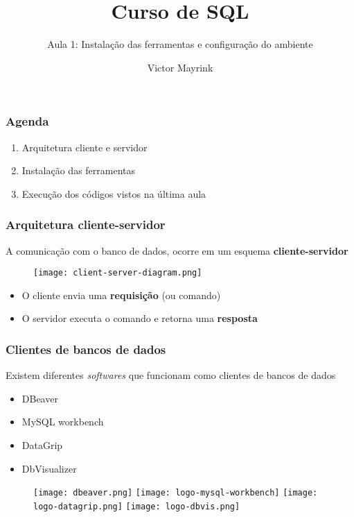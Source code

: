 \documentclass[t, 10pt, aspectratio=169, table, x11names]{beamer}
\begin{document}
	\author{Victor Mayrink}
	\title{Curso de SQL}
	\subtitle{Aula 1: Instalação das ferramentas e configuração do ambiente}

	\begin{frame}[plain]
		\maketitle
	\end{frame}
	
	\begin{frame}
		\frametitle{Agenda}
		\vspace{1cm}
		\begin{enumerate}
			\large
			\item Arquitetura cliente e servidor
			\item Instalação das ferramentas
			\item Execução dos códigos vistos na última aula
		\end{enumerate}
	\end{frame}

	\begin{frame}
		\frametitle{Arquitetura cliente-servidor}
		A comunicação com o banco de dados, ocorre em um esquema \textbf{cliente-servidor}
		\vspace{3mm}
		\begin{figure}[h]
			\texttt{[image: client-server-diagram.png]}
		\end{figure}
		\begin{itemize}
			\item O cliente envia uma \textbf{requisição} (ou comando)
			\item O servidor executa o comando e retorna uma \textbf{resposta}
		\end{itemize}
	\end{frame}
	
	\begin{frame}
		\frametitle{Clientes de bancos de dados}
		Existem diferentes \textit{softwares} que funcionam como clientes de bancos de dados
		\medskip
		\begin{itemize}
			\item DBeaver
			\item MySQL workbench
			\item DataGrip
			\item DbVisualizer
		\end{itemize}
		\begin{figure}
			\vspace{2mm}
			\centering
			\texttt{[image: dbeaver.png]}
			\hspace{10mm}
			\texttt{[image: logo-mysql-workbench]}
			\hspace{10mm}
			\texttt{[image: logo-datagrip.png]}
			\hspace{7mm}
			\texttt{[image: logo-dbvis.png]}
		\end{figure}
	\end{frame}
\end{document}
